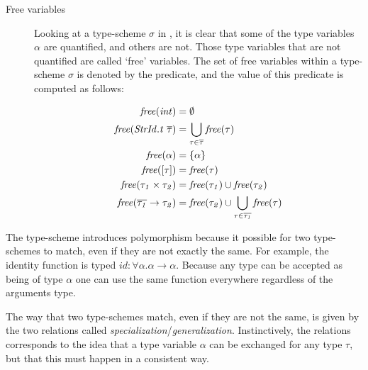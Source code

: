 \begin{description}
\item[Free variables]
Looking at a type-scheme $\sigma$ in , it is clear that some of the type variables $\alpha$ are quantified, and others are not.
Those type variables that are not quantified are called `free' variables.
The set of free variables within a type-scheme $\sigma$ is denoted by the predicate, and the value of this predicate is computed as follows:

\begin{align*}
\begin{aligned}
\mathit{free(int)} &= \mathit{\emptyset}\\
\mathit{free(StrId.t\ \overline{\tau})} &= \mathit{\bigcup_{\tau \in \overline{\tau}} free(\tau)}\\
\mathit{free(\alpha)} &= \mathit{\{\alpha\}}\\
\mathit{free([\tau])} &= \mathit{free(\tau)}\\
\mathit{free(\tau_{1} \times \tau_{2})} &= \mathit{free(\tau_{1}) \cup free(\tau_{2})} \\
\mathit{free(\overline{\tau_{1}} \rightarrow \tau_{2} )} &= \mathit{free(\tau_{2}) \cup \bigcup_{\tau \in \overline{\tau_{1}}} free(\tau)}
\end{aligned}
\end{align*}
\end{description}

The type-scheme introduces polymorphism because it possible for two type-schemes to match, even if they are not exactly the same.
For example, the identity function  is typed $id:\forall \alpha. \alpha \rightarrow \alpha$.
Because any type can be accepted as being of type $\alpha$ one can use the same  function everywhere regardless of the arguments type.

The way that two type-schemes match, even if they are not the same, is given by the two relations called \emph{specialization}/\emph{generalization}.
Instinctively, the relations corresponds to the idea that a type variable $\alpha$ can be exchanged for any type $\tau$, but that this must happen in a consistent way.



